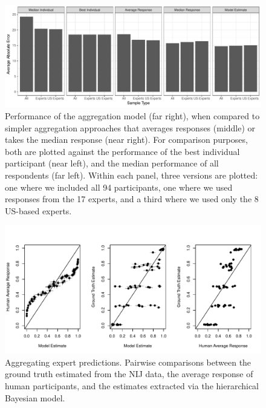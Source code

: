 \documentclass[doc]{apa6} %
\begin{document}
\begin{figure}[p]
\begin{center}
\includegraphics[scale=.6]{modelperformance.pdf}
\caption{Performance of the aggregation model (far right), when compared to simpler aggregation approaches that averages responses (middle) or takes the median response (near right). For comparison purposes, both are plotted against the performance of the best individual participant (near left), and the median performance of all respondents (far left). Within each panel, three versions are plotted: one where we included all 94 participants, one where we used responses from the 17 experts, and a third where we used only the 8 US-based experts.}
\label{modelperformance}
\end{center}
\end{figure}


\begin{figure}[p]
\begin{center}
\includegraphics[scale=.9]{aggregation.pdf}
\caption{Aggregating expert predictions. Pairwise comparisons between the ground truth estimated from the NIJ data, the average response of human participants, and the estimates extracted via the hierarchical Bayesian model.}
\label{aggregation}
\end{center}
\end{figure}
\end{document}
